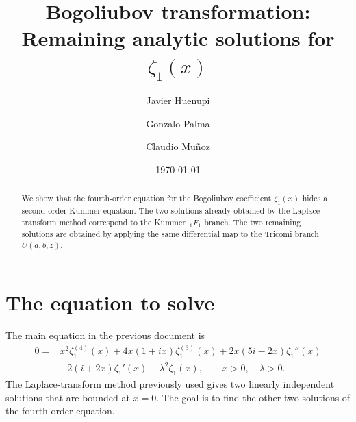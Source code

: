 \documentclass[%
 aip,
 jmp,%
 amsmath,amssymb,
 reprint,%
]{revtex4-2}
\begin{document}

\title[Bogoliubov transformation]{Bogoliubov transformation:\\
Remaining analytic solutions for $\zeta_1(x)$}

\author{Javier Huenupi}
\author{Gonzalo Palma}
%
\author{Claudio Mu\~noz}%
%

\date{\today}

\begin{abstract}
We show that the fourth-order equation for the Bogoliubov coefficient
$\zeta_1(x)$ hides a second-order Kummer equation.  The two solutions already
obtained by the Laplace-transform method correspond to the Kummer
$\,_1F_1$ branch.  The two remaining solutions are obtained by applying the
same differential map to the Tricomi branch $U(a,b,z)$.
\end{abstract}

\maketitle

\newcommand{\z}{\zeta}
\newcommand{\p}{\psi}
\newcommand{\K}{\mathcal{K}}
\newcommand{\M}{M}
\newcommand{\U}{U}

\section{The equation to solve}

The main equation in the previous document is
\begin{equation}
\label{eq:xode}
\begin{aligned}
0 ={}& x^2 \zeta_1^{(4)}(x)
 + 4x(1+ix)\zeta_1^{(3)}(x)
 + 2x(5i-2x)\zeta_1''(x)  \\
& - 2(i+2x)\zeta_1'(x)
 - \lambda^2 \zeta_1(x),
\qquad x>0,\quad \lambda>0.
\end{aligned}
\end{equation}
The Laplace-transform method previously used gives two linearly independent
solutions that are bounded at $x=0$.  The goal is to find the other two
solutions of the fourth-order equation.
\end{document}

